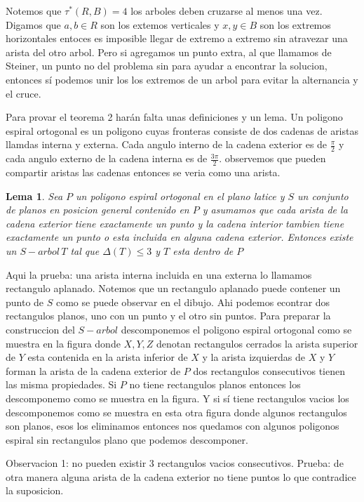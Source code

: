 \documentclass[11pt,a4paper]{article}
\newtheorem{lemma}{Lema}
\begin{document}
Notemos que $\tau^*(R, B) = 4$ los arboles deben cruzarse al menos una vez. Digamos que $a,b \in R$ son los extemos verticales y $x,y \in B$ son los extremos horizontales entoces es imposible llegar de extremo a extremo sin atravezar una arista del otro arbol. Pero si agregamos un punto extra, al que llamamos de Steiner, un punto no del problema sin para ayudar a encontrar la solucion, entonces sí podemos unir los los extremos de un arbol para evitar la alternancia y el cruce.

Para provar el teorema 2 harán falta unas definiciones y un lema. Un poligono espiral ortogonal es un poligono cuyas fronteras consiste de dos cadenas de aristas llamdas interna y externa. Cada angulo interno de la cadena exterior es de $\frac{\pi }{2}$ y cada angulo externo de la cadena interna es de $\frac{3\pi }{2}$. observemos que pueden compartir aristas las cadenas entonces se veria como una arista.
\begin{lemma}
Sea $P$ un poligono espiral ortogonal en el plano latice y $S$ un conjunto de planos en posicion general contenido en $P$ y asumamos que cada arista de la cadena exterior tiene exactamente un punto y la cadena interior tambien tiene exactamente un punto o esta incluida en alguna cadena exterior. Entonces existe un $S-arbol \, T$  tal que $\Delta (T) \leq 3$ y $T$ esta dentro de $P$
\end{lemma}

Aqui la prueba: una arista interna incluida en una externa lo llamamos rectangulo aplanado. Notemos que un rectangulo aplanado puede contener un punto de $S$ como se puede observar en el dibujo. Ahi podemos econtrar dos rectangulos planos, uno con un punto y el otro sin puntos. Para preparar la construccion del $S-arbol$ descomponemos el poligono espiral ortogonal como se muestra en la figura donde $X, Y, Z$ denotan  rectangulos cerrados la arista superior de $Y$ esta contenida en la arista inferior de $X$ y la arista izquierdas de $X$ y $Y$ forman la arista de la cadena exterior de $P$ dos rectangulos consecutivos tienen las misma propiedades. Si $P$ no tiene rectangulos planos entonces los descomponemo como se muestra en la figura. Y si sí tiene rectangulos vacios los descomponemos como se muestra en esta otra figura donde algunos rectangulos son planos, esos los eliminamos entonces nos quedamos con algunos poligonos espiral sin rectangulos plano que podemos descomponer.

Observacion 1: no pueden existir 3 rectangulos vacios consecutivos.
Prueba: de otra manera alguna arista de la cadena exterior no tiene puntos lo que contradice la suposicion. 
\end{document}
